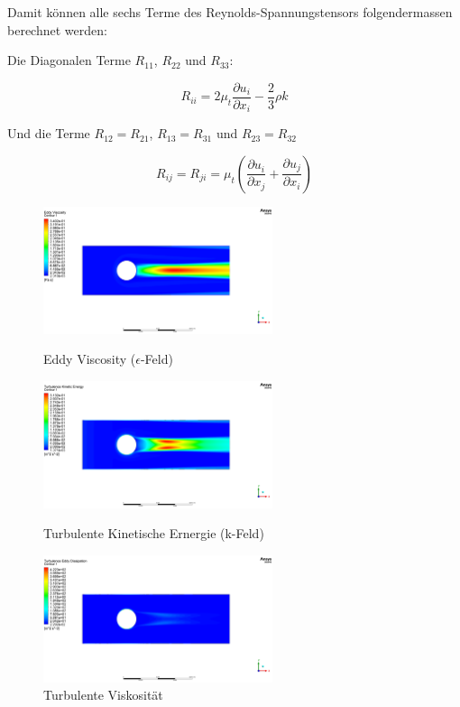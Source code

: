 Damit können alle sechs Terme des Reynolds-Spannungstensors folgendermassen berechnet werden:

Die Diagonalen Terme $R_{11}$, $R_{22}$ und $R_{33}$:

\begin{equation}
    R_{ii} = 2 \mu_t \frac{\partial u_i}{\partial x_i} - \frac{2}{3}\rho k
\end{equation}

Und die Terme $R_{12} = R_{21}$, $R_{13} = R_{31}$ und $R_{23} = R_{32}$

\begin{equation}
    R_{ij} = R_{ji} = \mu_t \left(\frac{\partial u_i}{\partial x_j} + \frac{\partial u_j}{\partial x_i}\right)
\end{equation}

\begin{figure}
  \centering
  \includegraphics[width=0.6\textwidth]{papers/reynolds/images/eddy-viscosity.png}
  \caption{Eddy Viscosity ($\epsilon$-Feld)}
  \label{fig:e}
  \centering
  \includegraphics[width=0.6\textwidth]{papers/reynolds/images/turbulence-kinetic-energy.png}
  \caption{Turbulente Kinetische Ernergie (k-Feld)}
  \label{fig:k}
  \centering
  \includegraphics[width=0.6\textwidth]{papers/reynolds/images/turbulent-viscosity.png}
  \caption{Turbulente Viskosität}
  \label{fig:mu-t}
\end{figure}